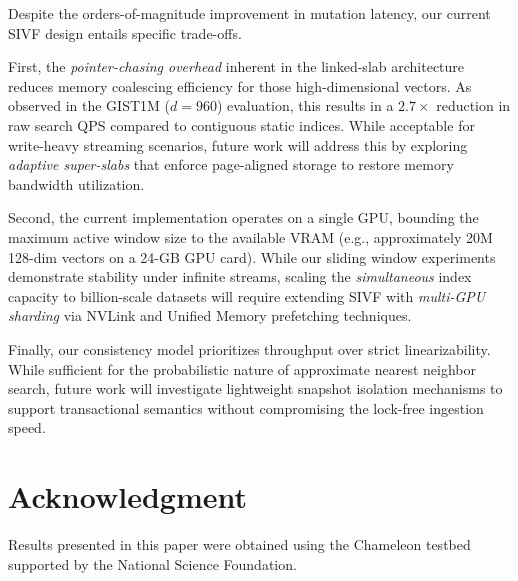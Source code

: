 \documentclass[sigconf,anonymous]{acmart}
\theoremstyle{plain}
\theoremstyle{definition}
\theoremstyle{remark}
\begin{document}


Despite the orders-of-magnitude improvement in mutation latency, our current SIVF design entails specific trade-offs. 

First, the \textit{pointer-chasing overhead} inherent in the linked-slab architecture reduces memory coalescing efficiency for those high-dimensional vectors. As observed in the GIST1M ($d=960$) evaluation, this results in a $2.7\times$ reduction in raw search QPS compared to contiguous static indices. While acceptable for write-heavy streaming scenarios, future work will address this by exploring \textit{adaptive super-slabs} that enforce page-aligned storage to restore memory bandwidth utilization.

Second, the current implementation operates on a single GPU, bounding the maximum active window size to the available VRAM (e.g., approximately 20M 128-dim vectors on a 24-GB GPU card). While our sliding window experiments demonstrate stability under infinite streams, scaling the \textit{simultaneous} index capacity to billion-scale datasets will require extending SIVF with \textit{multi-GPU sharding} via NVLink and Unified Memory prefetching techniques.

Finally, our consistency model prioritizes throughput over strict linearizability. While sufficient for the probabilistic nature of approximate nearest neighbor search, future work will investigate lightweight snapshot isolation mechanisms to support transactional semantics without compromising the lock-free ingestion speed.

\section*{Acknowledgment}
Results presented in this paper were obtained using the Chameleon testbed supported by the National Science Foundation.



\end{document}
